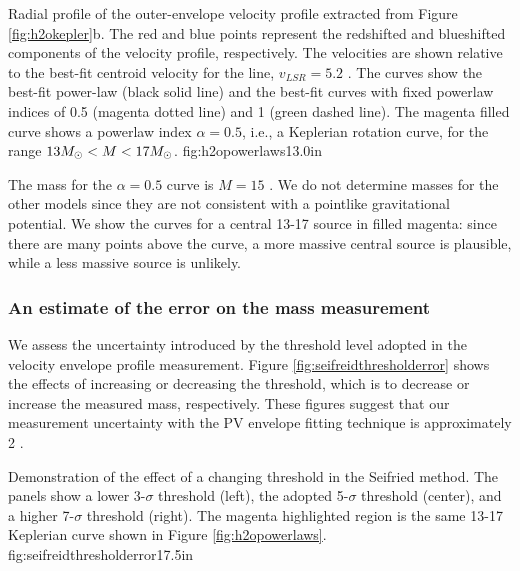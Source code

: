 \documentclass[twocolumn]{aastex61}
\begin{document}

{Radial profile of the outer-envelope velocity profile extracted from
Figure \ref{fig:h2okepler}b.  The red and blue points represent the redshifted
and blueshifted components of the velocity profile, respectively.  The velocities
are shown relative to the best-fit centroid velocity for the \water line,
$v_{LSR}=5.2$ \kms.  The curves show the best-fit power-law (black solid line)
and the best-fit curves with fixed powerlaw indices of 0.5 (magenta dotted line)
and 1 (green dashed line).  The magenta filled curve shows a powerlaw index
$\alpha=0.5$, i.e., a Keplerian rotation curve, for the range $13 M_{\odot} < M <
17 M_{\odot}$. }
{fig:h2opowerlaws}{1}{3.0in}



The mass for the $\alpha=0.5$ curve is $M=15$ \msun.  We do not determine
masses for the other models since they are not consistent with a pointlike
gravitational potential.  We show the curves for a central 13-17 \msun source
in filled magenta: since there are many points above the curve, a more massive
central source is plausible, while a less massive source is unlikely.

\subsubsection{An estimate of the error on the mass measurement}
\label{sec:errorestimate}
We  assess the uncertainty introduced by the threshold level adopted in the
velocity envelope profile measurement.  Figure \ref{fig:seifreidthresholderror}
shows the effects of increasing or decreasing the threshold, which is to
decrease or increase the measured mass, respectively.  These figures suggest
that our measurement uncertainty with the PV envelope fitting technique  is
approximately 2 \msun.

{Demonstration of the effect of a changing threshold in the Seifried method.
The panels show a lower 3-$\sigma$ threshold (left), the adopted 5-$\sigma$
threshold (center), and a higher 7-$\sigma$ threshold (right).  
The magenta highlighted region is the same 13-17 \msun Keplerian curve shown
in Figure \ref{fig:h2opowerlaws}.  
}
{fig:seifreidthresholderror}{1}{7.5in}
\end{document}
